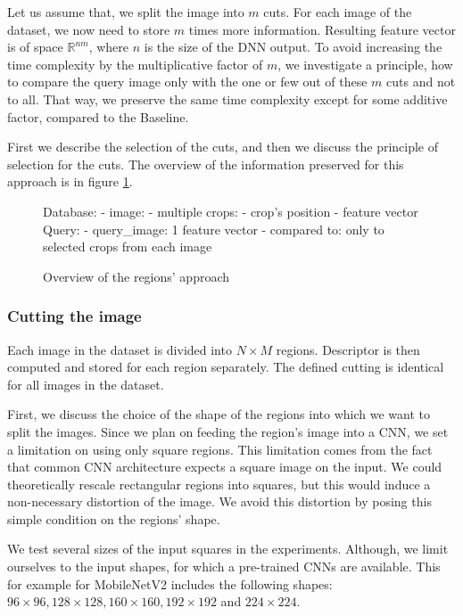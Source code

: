 Let us assume that, we split the image into $m$ cuts. For each image of the dataset, we now need to store $m$ times more information. Resulting feature vector is of space $\mathbb{R}^{nm}$, where $n$ is the size of the DNN output. To avoid increasing the time complexity by the multiplicative factor of $m$, we investigate a principle, how to compare the query image only with the one or few out of these $m$ cuts and not to all. That way, we preserve the same time complexity except for some additive factor, compared to the Baseline.

First we describe the selection of the cuts, and then we discuss the principle of selection for the cuts. The overview of the information preserved for this approach is in figure \ref{fig:overview_regions}.

\begin{figure}
\centering
\begin{boxedverbatim}
Database:
    - image:
        - multiple crops:
            - crop's position
            - feature vector
Query:
    - query_image: 1 feature vector
    - compared to: only to selected crops from each image
\end{boxedverbatim}
\caption{Overview of the regions' approach}
\label{fig:overview_regions}
\end{figure}

\subsubsection{Cutting the image}

Each image in the dataset is divided into $N \times M$ regions. Descriptor is then computed and stored for each region separately. The defined cutting is identical for all images in the dataset.

First, we discuss the choice of the shape of the regions into which we want to split the images. Since we plan on feeding the region's image into a CNN, we set a limitation on using only square regions. This limitation comes from the fact that common CNN architecture expects a square image on the input. We could theoretically rescale rectangular regions into squares, but this would induce a non-necessary distortion of the image. We avoid this distortion by posing this simple condition on the regions' shape.

We test several sizes of the input squares in the experiments. Although, we limit ourselves to the input shapes, for which a pre-trained CNNs are available. This for example for MobileNetV2 includes the following shapes: $96 \times 96, 128 \times 128, 160 \times 160, 192 \times 192$ and $224 \times 224$.

